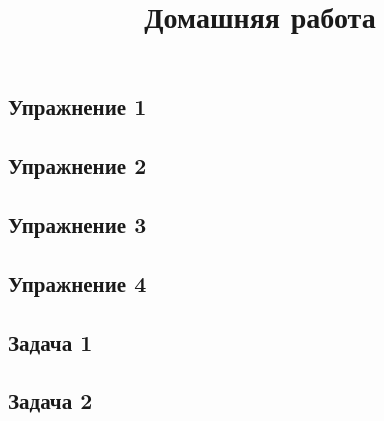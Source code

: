 \documentclass[a4paper, 12pt]{article}
\title{Домашняя работа \textnumero }
\author{}
\date{}
\begin{document}
\maketitle\thispagestyle{fancy}

\subsection*{Упражнение 1}
\lipsum[1-2]

\subsection*{Упражнение 2}
\lipsum[3-4]

\subsection*{Упражнение 3}
\lipsum[5-6]

\subsection*{Упражнение 4}
\lipsum[7-8]

\subsection*{Задача 1}
\lipsum[9-10]

\subsection*{Задача 2}
\lipsum[11-12]
\end{document}
